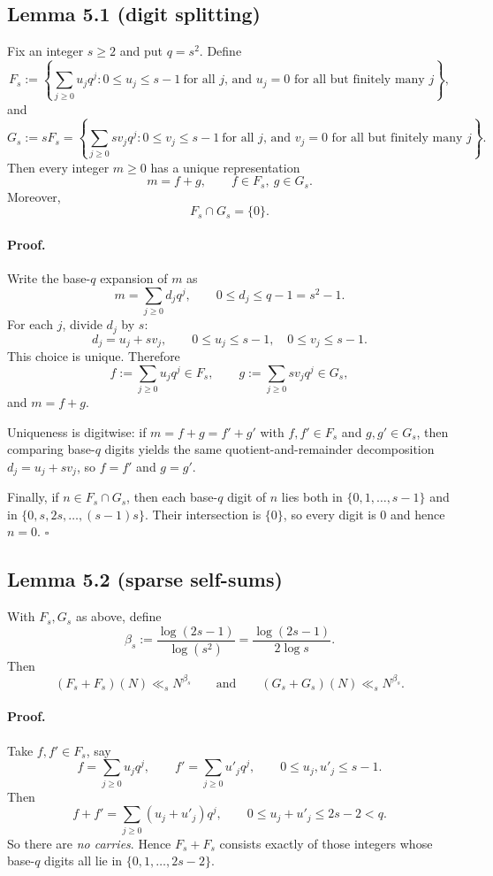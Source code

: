 \subsection*{Lemma 5.1 (digit splitting)}
Fix an integer $s\ge 2$ and put $q=s^2$.
Define
\[
F_s:=\left\{\sum_{j\ge 0} u_j q^j:
0\le u_j\le s-1\ \text{for all $j$, and $u_j=0$ for all but finitely many $j$}\right\},
\]
and
\[
G_s:=sF_s=\left\{\sum_{j\ge 0} sv_j q^j:
0\le v_j\le s-1\ \text{for all $j$, and $v_j=0$ for all but finitely many $j$}\right\}.
\]
Then every integer $m\ge 0$ has a unique representation
\[
m=f+g,\qquad f\in F_s,\ g\in G_s.
\]
Moreover,
\[
F_s\cap G_s=\{0\}.
\]

\paragraph{Proof.}
Write the base-$q$ expansion of $m$ as
\[
m=\sum_{j\ge 0} d_j q^j,\qquad 0\le d_j\le q-1=s^2-1.
\]
For each $j$, divide $d_j$ by $s$:
\[
d_j=u_j+sv_j,\qquad 0\le u_j\le s-1,\quad 0\le v_j\le s-1.
\]
This choice is unique. Therefore
\[
f:=\sum_{j\ge 0} u_j q^j\in F_s,
\qquad
g:=\sum_{j\ge 0} sv_j q^j\in G_s,
\]
and $m=f+g$.

Uniqueness is digitwise: if $m=f+g=f'+g'$ with $f,f'\in F_s$ and $g,g'\in G_s$, then comparing base-$q$ digits yields the same quotient-and-remainder decomposition $d_j=u_j+sv_j$, so $f=f'$ and $g=g'$.

Finally, if $n\in F_s\cap G_s$, then each base-$q$ digit of $n$ lies both in $\{0,1,\dots,s-1\}$ and in $\{0,s,2s,\dots,(s-1)s\}$. Their intersection is $\{0\}$, so every digit is $0$ and hence $n=0$.
\hfill$\square$

\subsection*{Lemma 5.2 (sparse self-sums)}
With $F_s,G_s$ as above, define
\[
\beta_s:=\frac{\log(2s-1)}{\log(s^2)}=\frac{\log(2s-1)}{2\log s}.
\]
Then
\[
(F_s+F_s)(N)\ll_s N^{\beta_s}
\qquad\text{and}\qquad
(G_s+G_s)(N)\ll_s N^{\beta_s}.
\]

\paragraph{Proof.}
Take $f,f'\in F_s$, say
\[
f=\sum_{j\ge 0} u_j q^j,
\qquad
f'=\sum_{j\ge 0} u'_j q^j,
\qquad 0\le u_j,u'_j\le s-1.
\]
Then
\[
f+f'=\sum_{j\ge 0}(u_j+u'_j)q^j,
\qquad 0\le u_j+u'_j\le 2s-2<q.
\]
So there are \emph{no carries}. Hence $F_s+F_s$ consists exactly of those integers whose base-$q$ digits all lie in $\{0,1,\dots,2s-2\}$.

